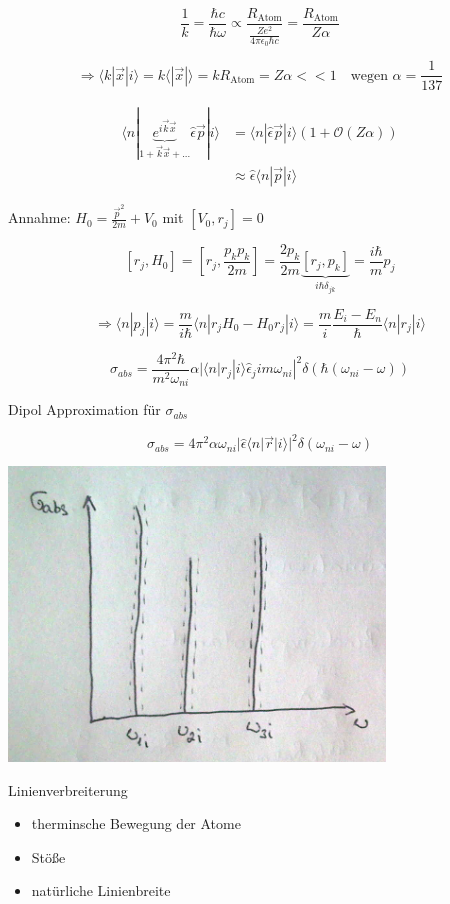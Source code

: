 \[\frac{1}{k}=\frac{\hbar c}{\hbar \omega}\propto \frac{R_{\text{Atom}}}{\frac{Ze^2}{4\pi\epsilon_0\hbar c}} = \frac{R_{\text{Atom}}}{Z\alpha}\]

\[\Rightarrow \langle k|\vec x|i\rangle  = k\langle |\vec x|\rangle = kR_{\text{Atom}} = Z\alpha <<1 \quad\text{wegen }\alpha=\frac{1}{137}\]

\begin{align}
  \langle n|\underbrace{e^{i\vec k\vec x}}_{1+\vec k\vec x+...}\hat \epsilon \vec p|i\rangle &=\langle n|\hat \epsilon\vec p|i\rangle (1+\mathcal O(Z\alpha))\\
  &\approx \hat \epsilon \langle n|\vec p|i\rangle
\end{align}

Annahme: \(H_0 = \frac{\vec p^2}{2m}+V_0\) mit \([V_0,r_j]=0\)

\[[r_{j},H_0]=[r_{j},\frac{p_kp_k}{2m}] = \frac{2p_k}{2m}\underbrace{[r_{j},p_k]}_{i\hbar\delta_{jk}} = \frac{i\hbar}{m}p_j\]

\[\Rightarrow \langle n|p_j|i\rangle = \frac{m}{i\hbar}\langle n|r_jH_0-H_0r_j|i\rangle =\frac{m}{i}\frac{E_i-E_n}{\hbar}\langle n|r_j|i\rangle \]

\[\sigma_{abs} = \frac{4\pi^2\hbar}{m^2\omega_{ni}}\alpha|\langle n|r_j|i\rangle \hat \epsilon_j im\omega_{ni}|^2\delta(\hbar(\omega_{ni}-\omega))\]

Dipol Approximation für \(\sigma_{abs}\)

\[\boxed{\sigma_{abs}=4\pi^2\alpha\omega_{ni}|\hat\epsilon\langle n|\vec r|i\rangle|^2\delta(\omega_{ni}-\omega)  }\]

\includegraphics[width=0.75\textwidth]{kap03_12.png}

Linienverbreiterung
\begin{itemize}
\item therminsche Bewegung der Atome
\item Stöße
\item natürliche Linienbreite
\end{itemize}

